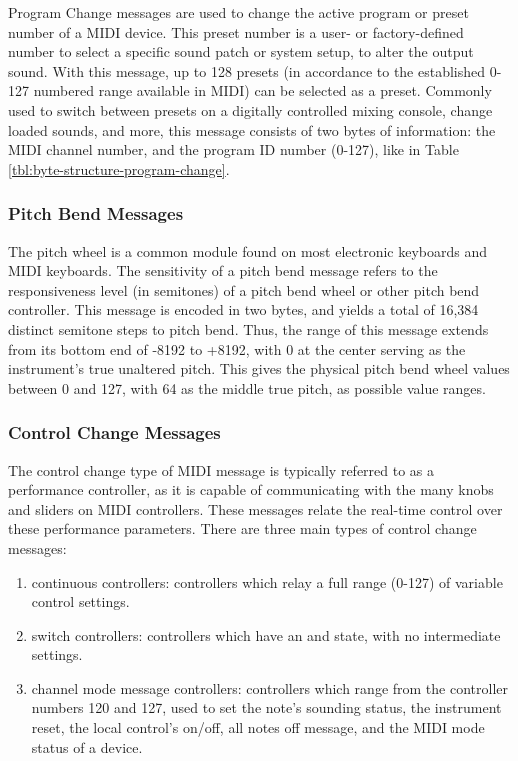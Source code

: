 Program Change messages are used to change the active program or preset number of a MIDI device. This preset number is a user- or factory-defined number to select a specific sound patch or system setup, to alter the output sound. With this message, up to 128 presets (in accordance to the established 0-127 numbered range available in MIDI) can be selected as a preset\cite{Huber_2012}. Commonly used to switch between presets on a digitally controlled mixing console, change loaded sounds, and more, this message consists of two bytes of information: the MIDI channel number, and the program ID number (0-127), like in Table \ref{tbl:byte-structure-program-change}.


\subsubsection{Pitch Bend Messages}

The pitch wheel is a common module found on most electronic keyboards and MIDI keyboards. The sensitivity of a pitch bend message refers to the responsiveness level (in semitones) of a pitch bend wheel or other pitch bend controller. This message is encoded in two bytes\cite{McGuire_2014}, and yields a total of 16,384 distinct semitone steps to pitch bend. Thus, the range of this message extends from its bottom end of -8192 to +8192, with 0 at the center serving as the instrument's true unaltered pitch\cite{Huber_2012}. This gives the physical pitch bend wheel values between 0 and 127, with 64 as the middle true pitch, as possible value ranges.

\subsubsection{Control Change Messages}

The control change type of MIDI message is typically referred to as a performance controller, as it is capable of communicating with the many knobs and sliders on MIDI controllers. These messages relate the real-time control over these performance parameters. There are three main types of control change messages:

\begin{enumerate}
	\item continuous controllers: controllers which relay a full range (0-127) of variable control settings.
	\item switch controllers: controllers which have an  and  state, with no intermediate settings.
	\item channel mode message controllers: controllers which range from the controller numbers 120 and 127, used to set the note's sounding status, the instrument reset, the local control's on/off, all notes off message, and the MIDI mode status of a device.
\end{enumerate}

